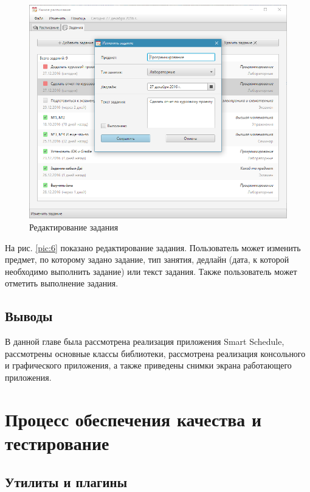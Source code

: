 \begin{figure}[H]
	\begin{center}
		\includegraphics[scale=0.8]{pics/7}
		\caption{Редактирование задания} 
		\label{pic:7} %
	\end{center}
\end{figure}
На рис. \ref{pic:6} показано редактирование задания. Пользователь может изменить предмет, по которому задано задание, тип занятия, дедлайн (дата, к которой необходимо выполнить задание) или текст задания. Также пользователь может отметить выполнение задания.

\subsection{Выводы}

В данной главе была рассмотрена реализация приложения Smart Schedule, рассмотрены основные классы библиотеки, рассмотрена реализация консольного и графического приложения, а также приведены снимки экрана работающего приложения.

\newpage
\section{Процесс обеспечения качества и тестирование}

\subsection{Утилиты и плагины}

